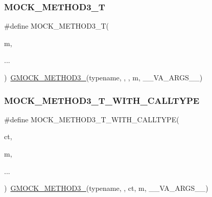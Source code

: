 \mbox{\label{_obj__test_2lib_2googletest-master_2googlemock_2include_2gmock_2gmock-generated-function-mockers_8h_a0b1576f68e6161f106e3d9ee7e3ac28b}} 
\subsubsection{\texorpdfstring{MOCK\_METHOD3\_T}{MOCK\_METHOD3\_T}}
{\footnotesize\ttfamily \#define M\+O\+C\+K\+\_\+\+M\+E\+T\+H\+O\+D3\+\_\+T(\begin{DoxyParamCaption}\item[{}]{m,  }\item[{}]{... }\end{DoxyParamCaption})~\mbox{\hyperlink{_obj__test_2lib_2googletest-release-1_88_81_2googlemock_2include_2gmock_2gmock-generated-function-mockers_8h_af7c77ba511c631de02bb8c45a6ed3045}{G\+M\+O\+C\+K\+\_\+\+M\+E\+T\+H\+O\+D3\+\_\+}}(typename, , , m, \+\_\+\+\_\+\+V\+A\+\_\+\+A\+R\+G\+S\+\_\+\+\_\+)}

\mbox{\label{_obj__test_2lib_2googletest-master_2googlemock_2include_2gmock_2gmock-generated-function-mockers_8h_a1e723cc1c62c9fedb9f54ee30c111047}} 
\subsubsection{\texorpdfstring{MOCK\_METHOD3\_T\_WITH\_CALLTYPE}{MOCK\_METHOD3\_T\_WITH\_CALLTYPE}}
{\footnotesize\ttfamily \#define M\+O\+C\+K\+\_\+\+M\+E\+T\+H\+O\+D3\+\_\+\+T\+\_\+\+W\+I\+T\+H\+\_\+\+C\+A\+L\+L\+T\+Y\+PE(\begin{DoxyParamCaption}\item[{}]{ct,  }\item[{}]{m,  }\item[{}]{... }\end{DoxyParamCaption})~\mbox{\hyperlink{_obj__test_2lib_2googletest-release-1_88_81_2googlemock_2include_2gmock_2gmock-generated-function-mockers_8h_af7c77ba511c631de02bb8c45a6ed3045}{G\+M\+O\+C\+K\+\_\+\+M\+E\+T\+H\+O\+D3\+\_\+}}(typename, , ct, m, \+\_\+\+\_\+\+V\+A\+\_\+\+A\+R\+G\+S\+\_\+\+\_\+)}

